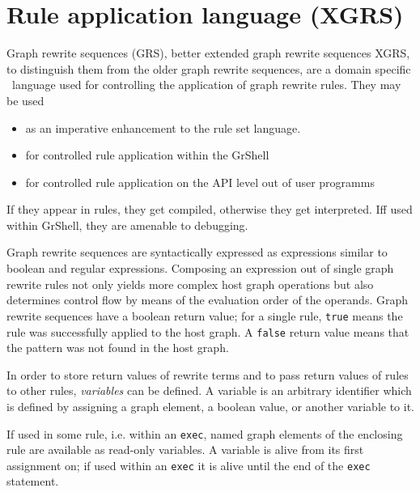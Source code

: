 \chapter{Rule application language (XGRS)}
\label{cha:xgrs}

Graph rewrite sequences (GRS), better extended graph rewrite sequences XGRS, to distinguish them from the older graph rewrite sequences, are a domain specific \GrG~language used for controlling the application of graph rewrite rules. 
They may be used
\begin{itemize}
\item as an imperative enhancement to the rule set language.
\item for controlled rule application within the GrShell
\item for controlled rule application on the API level out of user programms
\end{itemize}

If they appear in rules, they get compiled, otherwise they get interpreted.
Iff used within GrShell, they are amenable to debugging.

Graph rewrite sequences are syntactically expressed as expressions similar to boolean and regular expressions.
Composing an expression out of single graph rewrite rules not only yields more complex host graph operations but also determines control flow by means of the evaluation order of the operands.
Graph rewrite sequences have a boolean return value; for a single rule, \texttt{true} means the rule was successfully applied to the host graph.
A \texttt{false} return value means that the pattern was not found in the host graph.

In order to store return values of rewrite terms and to pass return values of rules to other rules, \emph{variables} can be defined.
A variable is an arbitrary identifier which is defined by assigning a graph element, a boolean value, or another variable to it.

If used in some rule, i.e. within an \texttt{exec}, named graph elements of the enclosing rule are available as read-only variables.
A variable is alive from its first assignment on; if used within an \texttt{exec} it is alive until the end of the \texttt{exec} statement.


